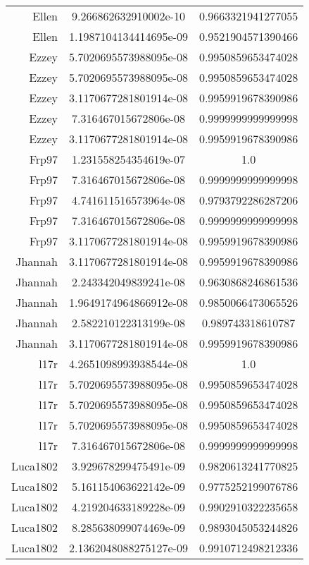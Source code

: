 \begin{tabular}{@{}r c c@{}}
    Ellen & 9.266862632910002e-10 & 0.9663321941277055 \\
    Ellen & 1.1987104134414695e-09 & 0.9521904571390466 \\
    Ezzey & 5.7020695573988095e-08 & 0.9950859653474028 \\
    Ezzey & 5.7020695573988095e-08 & 0.9950859653474028 \\
    Ezzey & 3.1170677281801914e-08 & 0.9959919678390986 \\
    Ezzey & 7.316467015672806e-08 & 0.9999999999999998 \\
    Ezzey & 3.1170677281801914e-08 & 0.9959919678390986 \\
    Frp97 & 1.231558254354619e-07 & 1.0 \\
    Frp97 & 7.316467015672806e-08 & 0.9999999999999998 \\
    Frp97 & 4.741611516573964e-08 & 0.9793792286287206 \\
    Frp97 & 7.316467015672806e-08 & 0.9999999999999998 \\
    Frp97 & 3.1170677281801914e-08 & 0.9959919678390986 \\
    Jhannah & 3.1170677281801914e-08 & 0.9959919678390986 \\
    Jhannah & 2.243342049839241e-08 & 0.9630868246861536 \\
    Jhannah & 1.9649174964866912e-08 & 0.9850066473065526 \\
    Jhannah & 2.582210122313199e-08 & 0.989743318610787 \\
    Jhannah & 3.1170677281801914e-08 & 0.9959919678390986 \\
    l17r & 4.2651098993938544e-08 & 1.0 \\
    l17r & 5.7020695573988095e-08 & 0.9950859653474028 \\
    l17r & 5.7020695573988095e-08 & 0.9950859653474028 \\
    l17r & 5.7020695573988095e-08 & 0.9950859653474028 \\
    l17r & 7.316467015672806e-08 & 0.9999999999999998 \\
    Luca1802 & 3.929678299475491e-09 & 0.9820613241770825 \\
    Luca1802 & 5.161154063622142e-09 & 0.9775252199076786 \\
    Luca1802 & 4.219204633189228e-09 & 0.9902910322235658 \\
    Luca1802 & 8.285638099074469e-09 & 0.9893045053244826 \\
    Luca1802 & 2.1362048088275127e-09 & 0.9910712498212336 \\

\end{tabular}
